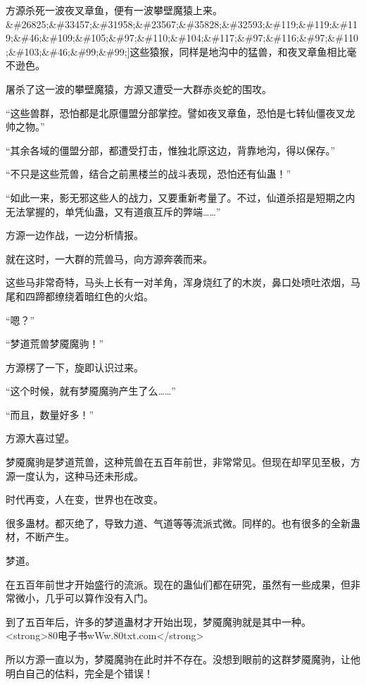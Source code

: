 
\begin{this_body}

方源杀死一波夜叉章鱼，便有一波攀壁魔猿上来。\&\#26825;\&\#33457;\&\#31958;\&\#23567;\&\#35828;\&\#32593;\&\#119;\&\#119;\&\#119;\&\#46;\&\#109;\&\#105;\&\#97;\&\#110;\&\#104;\&\#117;\&\#97;\&\#116;\&\#97;\&\#110;\&\#103;\&\#46;\&\#99;\&\#99;]这些猿猴，同样是地沟中的猛兽，和夜叉章鱼相比毫不逊色。

屠杀了这一波的攀壁魔猿，方源又遭受一大群赤炎蛇的围攻。

“这些兽群，恐怕都是北原僵盟分部掌控。譬如夜叉章鱼，恐怕是七转仙僵夜叉龙帅之物。”

“其余各域的僵盟分部，都遭受打击，惟独北原这边，背靠地沟，得以保存。”

“不只是这些荒兽，结合之前黑楼兰的战斗表现，恐怕还有仙蛊！”

“如此一来，影无邪这些人的战力，又要重新考量了。不过，仙道杀招是短期之内无法掌握的，单凭仙蛊，又有道痕互斥的弊端……”

方源一边作战，一边分析情报。

就在这时，一大群的荒兽马，向方源奔袭而来。

这些马非常奇特，马头上长有一对羊角，浑身烧红了的木炭，鼻口处喷吐浓烟，马尾和四蹄都缭绕着暗红色的火焰。

“嗯？”

“梦道荒兽梦魇魔驹！”

方源楞了一下，旋即认识过来。

“这个时候，就有梦魇魔驹产生了么……”

“而且，数量好多！”

方源大喜过望。

梦魇魔驹是梦道荒兽，这种荒兽在五百年前世，非常常见。但现在却罕见至极，方源一度认为，这种马还未形成。

时代再变，人在变，世界也在改变。

很多蛊材。都灭绝了，导致力道、气道等等流派式微。同样的。也有很多的全新蛊材，不断产生。

梦道。

在五百年前世才开始盛行的流派。现在的蛊仙们都在研究，虽然有一些成果，但非常微小，几乎可以算作没有入门。

到了五百年后，许多的梦道蛊材才开始出现，梦魇魔驹就是其中一种。<strong>80电子书wWw.80txt.com</strong>

所以方源一直以为，梦魇魔驹在此时并不存在。没想到眼前的这群梦魇魔驹，让他明白自己的估料，完全是个错误！


\end{this_body}
